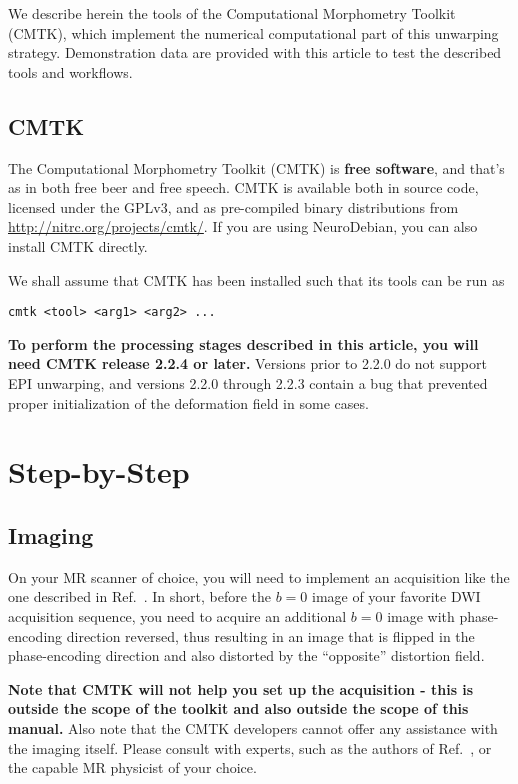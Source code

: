 \documentclass{InsightArticle}
\begin{document}
We describe herein the tools of the Computational Morphometry Toolkit (CMTK),
which implement the numerical computational part of this unwarping
strategy. Demonstration data are provided with this article to test the
described tools and workflows.

\subsection{CMTK}

The Computational Morphometry Toolkit (CMTK) is {\bf free software}, and
that's as in both free beer and free speech. CMTK is available both in source
code, licensed under the GPLv3, and as pre-compiled binary distributions from
\url{http://nitrc.org/projects/cmtk/}. If you are using NeuroDebian, you can
also install CMTK directly.

We shall assume that CMTK has been installed such that its tools can be run as
\begin{verbatim}
cmtk <tool> <arg1> <arg2> ...
\end{verbatim}

{\bf To perform the processing stages described in this article, you will need
CMTK release 2.2.4 or later.} Versions prior
to 2.2.0 do not support EPI unwarping, and versions 2.2.0 through 2.2.3
contain a bug that prevented proper initialization of the deformation field in
some cases.

\section{Step-by-Step}

\subsection{Imaging}

On your MR scanner of choice, you will need to implement an acquisition like
the one described in Ref.~\cite{HollKupeDale:2010}. In short, before the $b=0$
image of your favorite DWI acquisition sequence, you need to acquire an
additional $b=0$ image with phase-encoding direction reversed, thus resulting
in an image that is flipped in the phase-encoding direction and also distorted
by the ``opposite'' distortion field. 

{\bf Note that CMTK will not help you set up the acquisition - this is outside
the scope of the toolkit and also outside the scope of this manual.} Also note
that the CMTK developers cannot offer any assistance with the imaging
itself. Please consult with experts, such as the authors of
Ref.~\cite{HollKupeDale:2010}, or the capable MR physicist of your choice.
\end{document}
